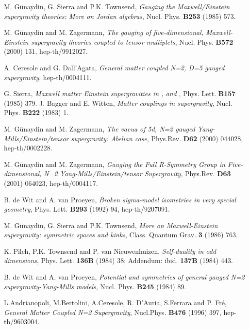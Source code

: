 \documentclass[a4paper,11pt]{article}
\begin{document}
\begin{thebibliography}{99}
 M. G\"{u}naydin, G. Sierra and P.K. Townsend, \emph{Gauging
the \coordHE{} Maxwell/Einstein supergravity theories: More on Jordan
algebras}, Nucl. Phys.  \textbf{B253} (1985) 573. 

 M. G\"{u}naydin and M. Zagermann, \emph{The gauging of
five-dimensional, \coordHE{} Maxwell-Einstein supergravity theories
coupled to tensor multiplets}, Nucl. Phys. \textbf{B572} (2000) 131,
hep-th/9912027.

 A. Ceresole and G. Dall'Agata, \emph{General matter
coupled N=2, D=5 gauged supergravity}, hep-th/0004111.

 G. Sierra, \emph{\coordHE{} Maxwell matter Einstein
supergravities in \coordHE{}, \coordHE{} and \coordHE{}}, Phys. Lett. \textbf{B157} (1985)
379.
 J. Bagger and E. Witten, \emph{Matter couplings in \coordHE{} supergravity},
Nucl. Phys. \textbf{B222} (1983) 1.

 M. G\"{u}naydin and M. Zagermann, \emph{The vacua of
5d, N=2 gauged Yang-Mills/Einstein/tensor supergravity: Abelian case},
Phys.Rev. \textbf{D62} (2000) 044028,
hep-th/0002228.

 M. G\"{u}naydin and M. Zagermann, \emph{Gauging the
Full R-Symmetry Group in Five-dimensional, N=2 Yang-Mills/Einstein/tensor
Supergravity}, Phys.Rev. \textbf{D63} (2001) 064023, hep-th/0004117.


 B. de Wit and A. van Proeyen, \emph{Broken
sigma-model isometries in very special geometry},  Phys. Lett. \textbf{B293}
(1992) 94, hep-th/9207091.

 M. G\"{u}naydin, G. Sierra and P.K. Townsend,
\emph{More on \coordHE{} Maxwell-Einstein supergravity: symmetric spaces and
kinks}, Class. Quantum Grav. \textbf{3} (1986) 763.


 K. Pilch, P.K. Townsend and P. van Nieuwenhuizen,
\emph{Self-duality in odd dimensions}, Phys. Lett. \textbf{136B}  (1984) 38;
Addendum: ibid. \textbf{137B} (1984) 443.

 B. de Wit and A. van Proeyen, \emph{Potential
and symmetries of general gauged N=2 supergravity-Yang-Mills models},
Nucl. Phys. \textbf{B245} (1984) 89.

 L.Andrianopoli, M.Bertolini, A.Ceresole, R. D'Auria,
S.Ferrara and P. Fr\'{e}, \emph{General Matter Coupled N=2 Supergravity},
Nucl.Phys. \textbf{B476} (1996) 397, hep-th/9603004.


\end{thebibliography}
\end{document}
